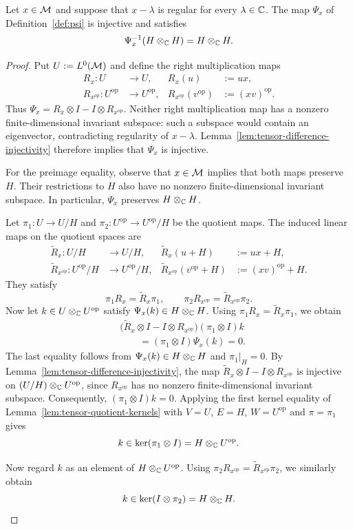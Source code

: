 \begin{lemma}\label{lem:tensor-l2-recovery}
Let $x\in\mathcal M$ and suppose that $x-\lambda$ is regular for every $\lambda\in\mathbb C$.
The map $\Psi_x$ of Definition~\ref{def:psi} is injective and satisfies
\[
 \Psi_x^{-1}(H\otimes_{\mathbb C}H)=H\otimes_{\mathbb C}H.
\]
\end{lemma}
\begin{proof}
Put $U:=L^0(\mathcal M)$ and define the right multiplication maps
\[
 \begin{aligned}
 R_x:U&\longrightarrow U,& R_x(u)&:=ux,\\
 R_{x^{\mathrm{op}}}:U^{\mathrm{op}}&\longrightarrow U^{\mathrm{op}},&
 R_{x^{\mathrm{op}}}(v^{\mathrm{op}})&:=(xv)^{\mathrm{op}}.
 \end{aligned}
\]
Thus $\Psi_x=R_x\otimes I-I\otimes R_{x^{\mathrm{op}}}$.
Neither right multiplication map has a nonzero finite-dimensional invariant subspace: such a subspace would contain an eigenvector, contradicting regularity of $x-\lambda$.
Lemma~\ref{lem:tensor-difference-injectivity} therefore implies that $\Psi_x$ is injective.

For the preimage equality, observe that $x\in\mathcal M$ implies that both maps preserve $H$.
Their restrictions to $H$ also have no nonzero finite-dimensional invariant subspace.
In particular, $\Psi_x$ preserves $H\otimes_{\mathbb C}H$.

Let $\pi_1:U\to U/H$ and $\pi_2:U^{\mathrm{op}}\to U^{\mathrm{op}}/H$ be the quotient maps.
The induced linear maps on the quotient spaces are
\[
 \begin{aligned}
 \widetilde R_x:U/H&\longrightarrow U/H,&
 \widetilde R_x(u+H)&:=ux+H,\\
 \widetilde R_{x^{\mathrm{op}}}:U^{\mathrm{op}}/H&\longrightarrow U^{\mathrm{op}}/H,&
 \widetilde R_{x^{\mathrm{op}}}(v^{\mathrm{op}}+H)&:=(xv)^{\mathrm{op}}+H.
 \end{aligned}
\]
They satisfy
\[
 \pi_1R_x=\widetilde R_x\pi_1,
 \qquad
 \pi_2R_{x^{\mathrm{op}}}=\widetilde R_{x^{\mathrm{op}}}\pi_2.
\]
Now let $k\in U\otimes_{\mathbb C}U^{\mathrm{op}}$ satisfy $\Psi_x(k)\in H\otimes_{\mathbb C}H$.
Using $\pi_1R_x=\widetilde R_x\pi_1$, we obtain
\[
 \begin{aligned}
 &\bigl(\widetilde R_x\otimes I-I\otimes R_{x^{\mathrm{op}}}\bigr)
    (\pi_1\otimes I)k\\
 &\qquad=(\pi_1\otimes I)\Psi_x(k)=0.
 \end{aligned}
\]
The last equality follows from $\Psi_x(k)\in H\otimes_{\mathbb C}H$ and $\pi_1|_H=0$.
By Lemma~\ref{lem:tensor-difference-injectivity}, the map $\widetilde R_x\otimes I-I\otimes R_{x^{\mathrm{op}}}$ is injective on $(U/H)\otimes_{\mathbb C}U^{\mathrm{op}}$, since $R_{x^{\mathrm{op}}}$ has no nonzero finite-dimensional invariant subspace.
Consequently, $(\pi_1\otimes I)k=0$.
Applying the first kernel equality of Lemma~\ref{lem:tensor-quotient-kernels} with $V=U$, $E=H$, $W=U^{\mathrm{op}}$ and $\pi=\pi_1$ gives
\[
 k\in\ker(\pi_1\otimes I)=H\otimes_{\mathbb C}U^{\mathrm{op}}.
\]

Now regard $k$ as an element of $H\otimes_{\mathbb C}U^{\mathrm{op}}$.
Using $\pi_2R_{x^{\mathrm{op}}}=\widetilde R_{x^{\mathrm{op}}}\pi_2$, we similarly obtain
\[
 k\in\ker(I\otimes \pi_2)=H\otimes_{\mathbb C}H.
\]
\end{proof}

